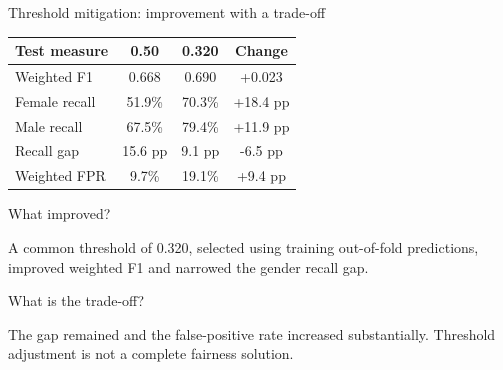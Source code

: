 \documentclass[aspectratio=169,10pt]{beamer}
\begin{document}

\begin{frame}{Threshold mitigation: improvement with a trade-off}

\small

\begin{table}

\centering

\begin{tabular}{lccc}

\toprule

\textbf{Test measure}
&
\textbf{0.50}
&
\textbf{0.320}
&
\textbf{Change}
\\

\midrule

Weighted F1
&
0.668
&
0.690
&
+0.023
\\

Female recall
&
51.9\%
&
70.3\%
&
+18.4 pp
\\

Male recall
&
67.5\%
&
79.4\%
&
+11.9 pp
\\

Recall gap
&
15.6 pp
&
9.1 pp
&
-6.5 pp
\\

Weighted FPR
&
9.7\%
&
19.1\%
&
+9.4 pp
\\

\bottomrule

\end{tabular}

\end{table}

\begin{block}{What improved?}

A common threshold of 0.320, selected using training out-of-fold predictions, improved weighted F1 and narrowed the gender recall gap.

\end{block}

\begin{alertblock}{What is the trade-off?}

The gap remained and the false-positive rate increased substantially. Threshold adjustment is not a complete fairness solution.

\end{alertblock}

\end{frame}
\end{document}
